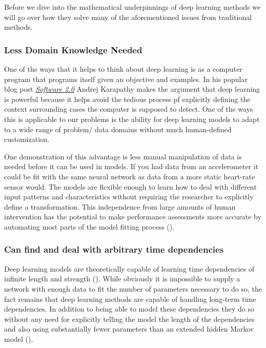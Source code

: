\documentclass[]{book}
\theoremstyle{definition}
\theoremstyle{definition}
\theoremstyle{definition}
\theoremstyle{remark}
\begin{document}
Before we dive into the mathematical underpinnings of deep learning
methods we will go over how they solve many of the aforementioned issues
from traditional methods.

\subsubsection{Less Domain Knowledge
Needed}\label{less-domain-knowledge-needed}

One of the ways that it helps to think about deep learning is as a
computer program that programs itself given an objective and examples.
In his popular blog post
\href{https://medium.com/@karpathy/software-2-0-a64152b37c35}{\emph{Software
2.0}} Andrej Karapathy makes the argument that deep learning is powerful
because it helps avoid the tedious process pf explicitly defining the
context surrounding cases the computer is supposed to detect. One of the
ways this is applicable to our problems is the ability for deep learning
models to adapt to a wide range of problem/ data domains without much
human-defined customization.

One demonstration of this advantage is less manual manipulation of data
is needed before it can be used in models. If you had data from an
accelerometer it could be fit with the same neural network as data from
a more static heart-rate sensor would. The models are flexible enough to
learn how to deal with different input patterns and characteristics
without requiring the researcher to explicitly define a transformation.
This independence from large amounts of human intervention has the
potential to make performance assessments more accurate by automating
most parts of the model fitting process (\citet{rms}).

\subsubsection{Can find and deal with arbitrary time
dependencies}\label{can-find-and-deal-with-arbitrary-time-dependencies}

Deep learning models are theoretically capable of learning time
dependencies of infinite length and strength
(\citet{universal_approximators}). While obviously it is impossible to
supply a network with enough data to fit the number of parameters
necessary to do so, the fact remains that deep learning methods are
capable of handling long-term time dependencies. In addition to being
able to model these dependencies they do so without any need for
explicitly telling the model the length of the dependencies and also
using substantially fewer parameters than an extended hidden Markov
model (\citet{graves_rnn}).
\end{document}

